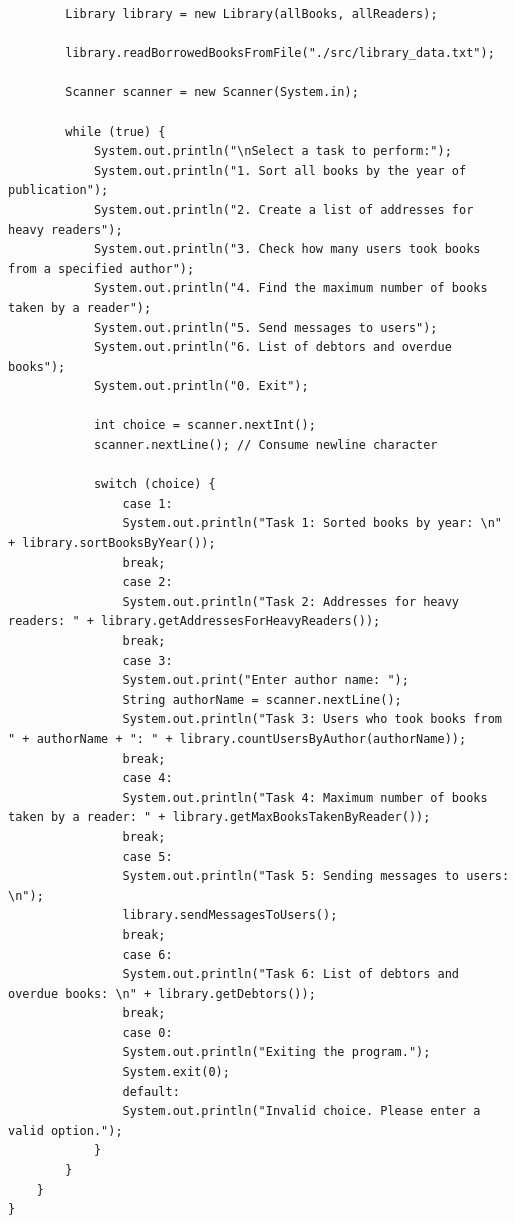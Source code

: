 \documentclass[14pt]{extreport}
\begin{document}
\begin{normalsize}
\begin{lstlisting}
		Library library = new Library(allBooks, allReaders);
		
		library.readBorrowedBooksFromFile("./src/library_data.txt");
		
		Scanner scanner = new Scanner(System.in);
		
		while (true) {
			System.out.println("\nSelect a task to perform:");
			System.out.println("1. Sort all books by the year of publication");
			System.out.println("2. Create a list of addresses for heavy readers");
			System.out.println("3. Check how many users took books from a specified author");
			System.out.println("4. Find the maximum number of books taken by a reader");
			System.out.println("5. Send messages to users");
			System.out.println("6. List of debtors and overdue books");
			System.out.println("0. Exit");
			
			int choice = scanner.nextInt();
			scanner.nextLine(); // Consume newline character
			
			switch (choice) {
				case 1:
				System.out.println("Task 1: Sorted books by year: \n" + library.sortBooksByYear());
				break;
				case 2:
				System.out.println("Task 2: Addresses for heavy readers: " + library.getAddressesForHeavyReaders());
				break;
				case 3:
				System.out.print("Enter author name: ");
				String authorName = scanner.nextLine();
				System.out.println("Task 3: Users who took books from " + authorName + ": " + library.countUsersByAuthor(authorName));
				break;
				case 4:
				System.out.println("Task 4: Maximum number of books taken by a reader: " + library.getMaxBooksTakenByReader());
				break;
				case 5:
				System.out.println("Task 5: Sending messages to users: \n");
				library.sendMessagesToUsers();
				break;
				case 6:
				System.out.println("Task 6: List of debtors and overdue books: \n" + library.getDebtors());
				break;
				case 0:
				System.out.println("Exiting the program.");
				System.exit(0);
				default:
				System.out.println("Invalid choice. Please enter a valid option.");
			}
		}
	}
}

	\end{lstlisting}	
	

\end{normalsize}
\end{document}
